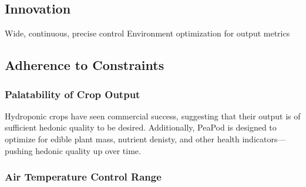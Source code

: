 \documentclass{report}
\begin{document}
\subsection{Innovation}
Wide, continuous, precise control
Environment optimization for output metrics

\subsection{Adherence to Constraints}

\subsubsection{Palatability of Crop Output} %
Hydroponic crops have seen commercial success, suggesting that their output is of sufficient hedonic quality to be desired. Additionally, PeaPod is designed to optimize for edible plant mass, nutrient denisty, and other health indicators---pushing hedonic quality up over time.

\subsubsection{Air Temperature Control Range} %
\end{document}

